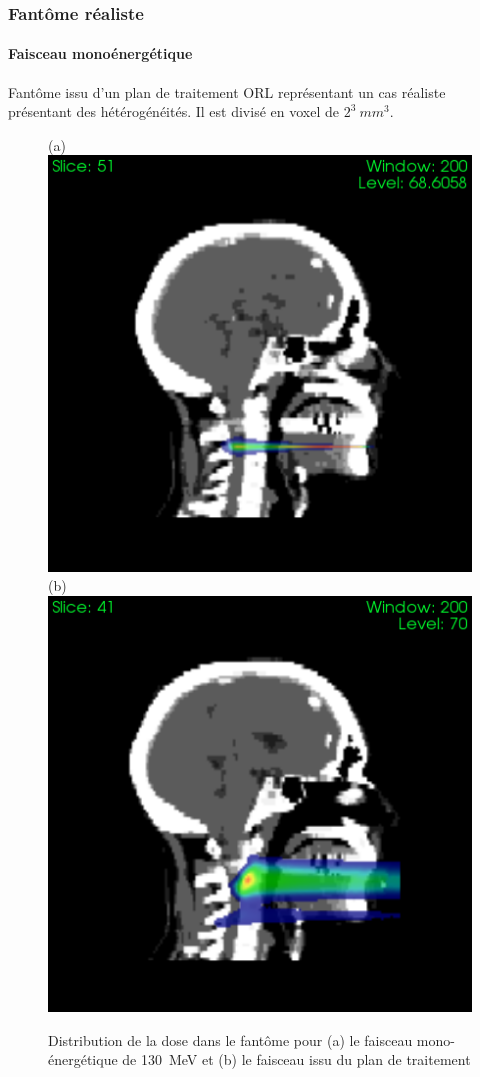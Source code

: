 \documentclass[11pt,a4paper,oldfontcommands]{memoir}
\begin{document}
\subsubsection{Fantôme réaliste}

\paragraph{Faisceau monoénergétique}

Fantôme issu d'un plan de traitement ORL représentant un cas réaliste présentant des hétérogénéités. Il est divisé en voxel de $2^{3}~mm^{3}$. 
  
\begin{figure}[h!]
\centering
\subfloat(a){\includegraphics[scale=0.37]{CT/130/profil.png}}
\subfloat(b){\includegraphics[scale=0.37]{CT/TPS/profil.png}}
\caption{Distribution de la dose dans le fantôme pour (a) le faisceau mono-énergétique de 130~MeV et (b) le faisceau issu du plan de traitement}
\label{profil}
\end{figure}
\end{document}
